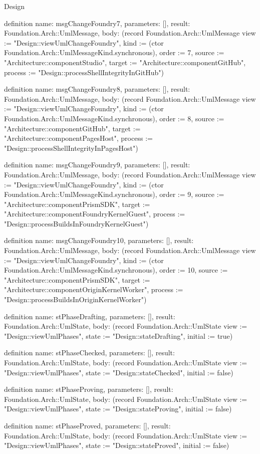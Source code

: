 \begin{lexlean}{Design}
\begin{semanticmodule}
definition{
  name: msgChangeFoundry7,
  parameters: [],
  result: Foundation.Arch::UmlMessage,
  body: (record Foundation.Arch::UmlMessage {view := "Design::viewUmlChangeFoundry", kind := (ctor Foundation.Arch::UmlMessageKind.synchronous), order := 7, source := "Architecture::componentStudio", target := "Architecture::componentGitHub", process := "Design::processShellIntegrityInGitHub"})
}

definition{
  name: msgChangeFoundry8,
  parameters: [],
  result: Foundation.Arch::UmlMessage,
  body: (record Foundation.Arch::UmlMessage {view := "Design::viewUmlChangeFoundry", kind := (ctor Foundation.Arch::UmlMessageKind.synchronous), order := 8, source := "Architecture::componentGitHub", target := "Architecture::componentPagesHost", process := "Design::processShellIntegrityInPagesHost"})
}

definition{
  name: msgChangeFoundry9,
  parameters: [],
  result: Foundation.Arch::UmlMessage,
  body: (record Foundation.Arch::UmlMessage {view := "Design::viewUmlChangeFoundry", kind := (ctor Foundation.Arch::UmlMessageKind.synchronous), order := 9, source := "Architecture::componentPrismSDK", target := "Architecture::componentFoundryKernelGuest", process := "Design::processBuildsInFoundryKernelGuest"})
}

definition{
  name: msgChangeFoundry10,
  parameters: [],
  result: Foundation.Arch::UmlMessage,
  body: (record Foundation.Arch::UmlMessage {view := "Design::viewUmlChangeFoundry", kind := (ctor Foundation.Arch::UmlMessageKind.synchronous), order := 10, source := "Architecture::componentPrismSDK", target := "Architecture::componentOriginKernelWorker", process := "Design::processBuildsInOriginKernelWorker"})
}

definition{
  name: stPhaseDrafting,
  parameters: [],
  result: Foundation.Arch::UmlState,
  body: (record Foundation.Arch::UmlState {view := "Design::viewUmlPhases", state := "Design::stateDrafting", initial := true})
}

definition{
  name: stPhaseChecked,
  parameters: [],
  result: Foundation.Arch::UmlState,
  body: (record Foundation.Arch::UmlState {view := "Design::viewUmlPhases", state := "Design::stateChecked", initial := false})
}

definition{
  name: stPhaseProving,
  parameters: [],
  result: Foundation.Arch::UmlState,
  body: (record Foundation.Arch::UmlState {view := "Design::viewUmlPhases", state := "Design::stateProving", initial := false})
}

definition{
  name: stPhaseProved,
  parameters: [],
  result: Foundation.Arch::UmlState,
  body: (record Foundation.Arch::UmlState {view := "Design::viewUmlPhases", state := "Design::stateProved", initial := false})
}


\end{semanticmodule}
\end{lexlean}
